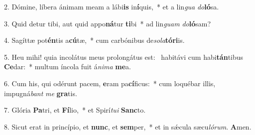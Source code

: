 2. Dómine, líbera ánimam meam a lábi\textbf{is} in\textbf{í}quis,~*  et a lin\textit{gua} \textit{do}\textbf{ló}sa.\

3. Quid detur tibi, aut quid appo\textbf{ná}tur \textbf{ti}bi~*  ad lin\textit{guam} \textit{do}\textbf{ló}sam?\

4. Sagíttæ pot\textbf{én}tis a\textbf{cú}tæ,~*  cum carbónibus de\textit{so}\textit{la}\textbf{tó}\textbf{ri}is.\

5. Heu mihi! quia incolátus meus prolongátus est: \dag\  habitávi cum habi\textbf{tán}tibus \textbf{Ce}dar:~*  multum íncola fuit á\textit{ni}\textit{ma} \textbf{me}a.\

6. Cum his, qui odérunt pacem, \textbf{e}ram pa\textbf{cí}ficus:~*  cum loquébar illis, impugná\textit{bant} \textit{me} \textbf{gra}tis.\

7. Glória \textbf{Pa}tri, et \textbf{Fí}lio,~*  et Spirí\textit{tu}\textit{i} \textbf{Sanc}to.\

8. Sicut erat in princípio, et \textbf{nunc}, et \textbf{sem}per,~*  et in sǽcula sæcu\textit{ló}\textit{rum}. \textbf{A}men.\

